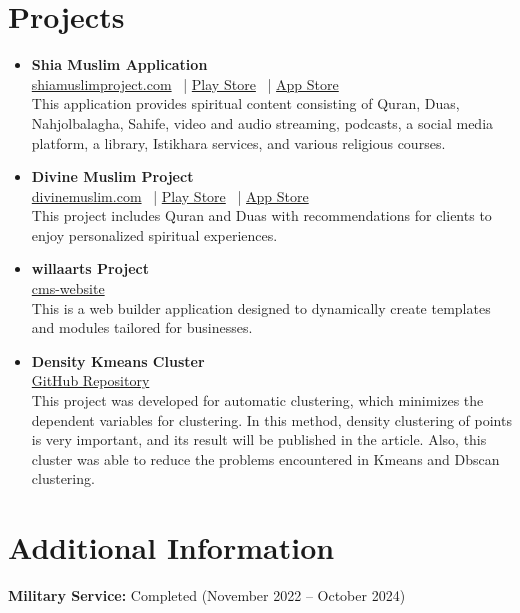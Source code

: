 \documentclass[10pt, letterpaper]{article}
\begin{document}
\section{Projects}
\begin{itemize}[leftmargin=*]
    \item \textbf{Shia Muslim Application} \\
    \href{https://shiamuslimproject.com/}{shiamuslimproject.com} \ |
    \href{https://play.google.com/store/apps/details?id=com.shiamuslimproject.main}{Play Store} \ |
    \href{https://apps.apple.com/app/shia-muslim/id1613187510}{App Store} \\
    This application provides spiritual content consisting of Quran, Duas, Nahjolbalagha, Sahife, video and audio streaming, podcasts, a social media platform, a library, Istikhara services, and various religious courses.
    \item \textbf{Divine Muslim Project} \\
    \href{https://divinemuslim.com/}{divinemuslim.com} \ |
    \href{https://play.google.com/store/apps/details?id=com.divine.muslim&pcampaignid=web_share}{Play Store} \ |
    \href{https://apps.apple.com/app/divine-muslim/id6453523582}{App Store} \\
    This project includes Quran and Duas with recommendations for clients to enjoy personalized spiritual experiences.
    \item \textbf{willaarts Project} \\
    \href{https://www.meshkee.com/cms-website}{cms-website} \\
    This is a web builder application designed to dynamically create templates and modules tailored for businesses.
    \item \textbf{Density Kmeans Cluster} \\
    \href{https://github.com/aliqasemi/DensityKmeans}{GitHub Repository} \\
    This project was developed for automatic clustering, which minimizes the dependent variables for clustering. In this method, density clustering of points is very important, and its result will be published in the article. Also, this cluster was able to reduce the problems encountered in Kmeans and Dbscan clustering.
\end{itemize}

\section{Additional Information}
\textbf{Military Service:} Completed (November 2022 -- October 2024)
\end{document}
